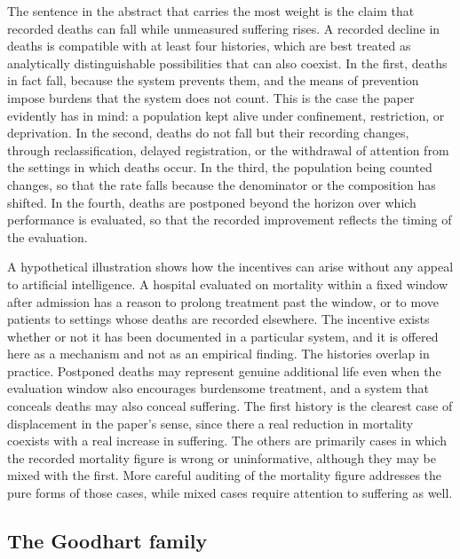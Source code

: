 \documentclass[11pt]{article}
\begin{document}
The sentence in the abstract that carries the most weight is the claim that recorded deaths can fall while unmeasured suffering rises. A recorded decline in deaths is compatible with at least four histories, which are best treated as analytically distinguishable possibilities that can also coexist. In the first, deaths in fact fall, because the system prevents them, and the means of prevention impose burdens that the system does not count. This is the case the paper evidently has in mind: a population kept alive under confinement, restriction, or deprivation. In the second, deaths do not fall but their recording changes, through reclassification, delayed registration, or the withdrawal of attention from the settings in which deaths occur. In the third, the population being counted changes, so that the rate falls because the denominator or the composition has shifted. In the fourth, deaths are postponed beyond the horizon over which performance is evaluated, so that the recorded improvement reflects the timing of the evaluation.

A hypothetical illustration shows how the incentives can arise without any appeal to artificial intelligence. A hospital evaluated on mortality within a fixed window after admission has a reason to prolong treatment past the window, or to move patients to settings whose deaths are recorded elsewhere. The incentive exists whether or not it has been documented in a particular system, and it is offered here as a mechanism and not as an empirical finding. The histories overlap in practice. Postponed deaths may represent genuine additional life even when the evaluation window also encourages burdensome treatment, and a system that conceals deaths may also conceal suffering. The first history is the clearest case of displacement in the paper's sense, since there a real reduction in mortality coexists with a real increase in suffering. The others are primarily cases in which the recorded mortality figure is wrong or uninformative, although they may be mixed with the first. More careful auditing of the mortality figure addresses the pure forms of those cases, while mixed cases require attention to suffering as well.
\subsection{The Goodhart family}
\end{document}
